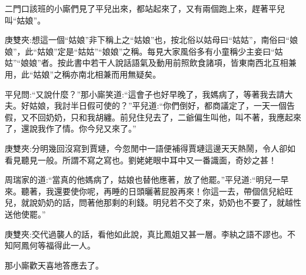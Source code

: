 \begin{parag}
    二門口該班的小廝們見了平兒出來，都站起來了，又有兩個跑上來，趕著平兒叫“姑娘”。\begin{note}庚雙夾:想這一個“姑娘”非下稱上之“姑娘”也，按北俗以姑母曰“姑姑”，南俗曰“娘娘”，此“姑娘”定是“姑姑”“娘娘”之稱。每見大家風俗多有小童稱少主妾曰“姑姑”“娘娘”者。按此書中若干人說話語氣及動用前照飲食諸項，皆東南西北互相兼用，此“姑娘”之稱亦南北相兼而用無疑矣。\end{note}平兒問:“又說什麼？”那小廝笑道:“這會子也好早晚了，我媽病了，等著我去請大夫。好姑娘，我討半日假可使的？”平兒道:“你們倒好，都商議定了，一天一個告假，又不回奶奶，只和我胡纏。前兒住兒去了，二爺偏生叫他，叫不著，我應起來了，還說我作了情。你今兒又來了。”\begin{note}庚雙夾:分明幾回沒寫到賈璉，今忽閒中一語便補得賈璉這邊天天熱鬧，令人卻如看見聽見一般。所謂不寫之寫也。劉姥姥眼中耳中又一番識面，奇妙之甚！\end{note}周瑞家的道:“當真的他媽病了，姑娘也替他應著，放了他罷。”平兒道:“明兒一早來。聽著，我還要使你呢，再睡的日頭曬著屁股再來！你這一去，帶個信兒給旺兒，就說奶奶的話，問著他那剩的利錢。明兒若不交了來，奶奶也不要了，就越性送他使罷。”\begin{note}庚雙夾:交代過襲人的話，看他如此說，真比鳳姐又甚一層。李紈之語不謬也。不知阿鳳何等福得此一人。\end{note}那小廝歡天喜地答應去了。
\end{parag}


